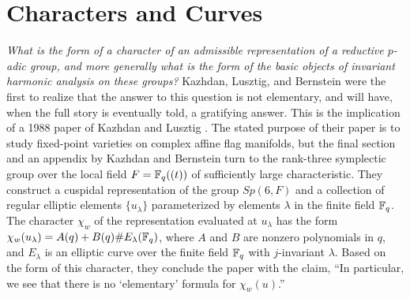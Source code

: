\documentclass{amsart}
\begin{document}




\maketitle






\section{Characters and Curves} %

{\it What is the form of a character of an admissible representation
of a reductive $p$-adic group, and more generally what 
is the form of 
the basic objects of invariant harmonic analysis on these groups?}
Kazhdan, Lusztig, and Bernstein were the first to realize that the answer
to this
question is not elementary, and will have, when the full story
is eventually told, a gratifying answer.
  This is the implication
of a 
1988 paper of Kazhdan and Lusztig \cite{KLB}.
The stated purpose of
their paper is to study fixed-point varieties on complex affine
flag manifolds,
but the final section and an appendix by Kazhdan
and Bernstein turn to the rank-three symplectic group
over the local field $F={\Bbb F}_q((t))$ of sufficiently
large characteristic.
They construct a 
cuspidal representation
of the group $Sp(6,F)$ and a collection of regular elliptic 
elements $\{u_\lambda\}$ parameterized by elements $\lambda$ in
the finite field ${\Bbb F}_q$.  The character $\chi_w$
of the representation
evaluated at $u_\lambda$ has the form $\chi_w(u_\lambda) = A(q) + B(q)
\# E_\lambda({\Bbb F}_q)$, where $A$ and $B$ are 
nonzero polynomials in $q$,
and $E_\lambda$ is an elliptic curve over the finite field ${\Bbb F}_q$
with $j$-invariant $\lambda$.  Based on the form of this character,
they conclude the paper with the 
claim, ``In particular, we see that there is
no `elementary' formula for $\chi_w(u)$.'' 
\end{document}
